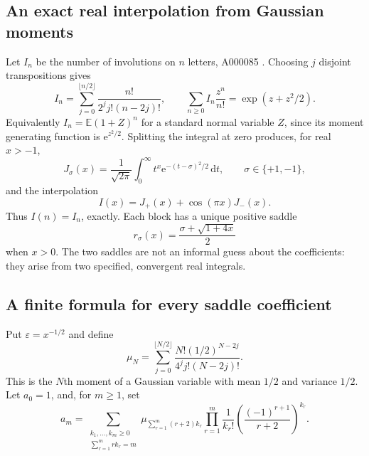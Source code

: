\documentclass[11pt,a4paper]{article}
\theoremstyle{definition}
\theoremstyle{remark}
\newcommand{\dd}{\mathrm d}
\newcommand{\ee}{\mathrm e}
\numberwithin{equation}{section}
\begin{document}
\subsection{An exact real interpolation from Gaussian moments}
Let $I_n$ be the number of involutions on $n$ letters, A000085 \cite{oeisinvolutions}. Choosing $j$ disjoint transpositions gives
\begin{equation}
 I_n=\sum_{j=0}^{\lfloor n/2\rfloor}
 \frac{n!}{2^j j!(n-2j)!},\qquad
 \sum_{n\ge0}I_n\frac{z^n}{n!}=\exp(z+z^2/2).
 \label{eq:involutionexact}
\end{equation}
Equivalently $I_n=\mathbb E(1+Z)^n$ for a standard normal variable $Z$, since its moment generating function is $\ee^{z^2/2}$. Splitting the integral at zero produces, for real $x>-1$,
\begin{equation}
 J_\sigma(x)=\frac1{\sqrt{2\pi}}\int_0^\infty
 t^x\ee^{-(t-\sigma)^2/2}\,\dd t,\qquad \sigma\in\{+1,-1\},
 \label{eq:involutionblocks}
\end{equation}
and the interpolation
\begin{equation}
 I(x)=J_+(x)+\cos(\pi x)J_-(x).
 \label{eq:involutioninterp}
\end{equation}
Thus $I(n)=I_n$, exactly. Each block has a unique positive saddle
\begin{equation}
 r_\sigma(x)=\frac{\sigma+\sqrt{1+4x}}2
 \label{eq:ivsaddle}
\end{equation}
when $x>0$. The two saddles are not an informal guess about the coefficients: they arise from two specified, convergent real integrals.

\subsection{A finite formula for every saddle coefficient}
Put $\varepsilon=x^{-1/2}$ and define
\begin{equation}
 \mu_N=\sum_{j=0}^{\lfloor N/2\rfloor}
 \frac{N!(1/2)^{N-2j}}{4^j j!(N-2j)!}.
 \label{eq:ivmu}
\end{equation}
This is the $N$th moment of a Gaussian variable with mean $1/2$ and variance $1/2$. Let $a_0=1$, and, for $m\ge1$, set
\begin{equation}
 a_m=\sum_{\substack{k_1,\ldots,k_m\ge0\\\sum_{r=1}^m r k_r=m}}
 \mu_{\sum_{r=1}^m(r+2)k_r}
 \prod_{r=1}^m\frac{1}{k_r!}
 \left(\frac{(-1)^{r+1}}{r+2}\right)^{k_r}.
 \label{eq:ivcoeff}
\end{equation}
\end{document}
